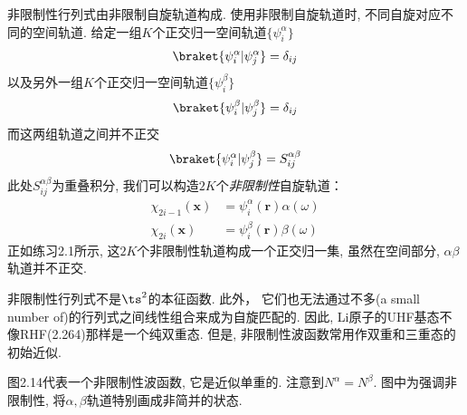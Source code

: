 非限制性行列式由非限制自旋轨道构成. 
使用非限制自旋轨道时, 
不同自旋对应不同的空间轨道. 
给定一组$K$个正交归一空间轨道$\{\psi_i^\alpha\}$
\begin{align}
\braket{\psi_i^\alpha|\psi_j^\alpha}=\delta_{ij}
\end{align}
以及另外一组$K$个正交归一空间轨道$\{\psi_i^\beta\}$
\begin{align}
\braket{\psi_i^\beta|\psi_j^\beta}=\delta_{ij}
\end{align}
而这两组轨道之间并不正交
\begin{align}
\braket{\psi_i^\alpha|\psi_j^\beta}=S_{ij}^{\alpha\beta}
\end{align}
此处$S_{ij}^{\alpha\beta}$为重叠积分, 
我们可以构造$2K$个\emph{非限制性}自旋轨道：
\begin{equation}
\begin{split}
\chi_{2i-1}(\mathbf{x}) &= \psi_i^\alpha(\mathbf{r})\alpha(\omega)\\
\chi_{2i}(\mathbf{x})   &= \psi_i^\beta(\mathbf{r})\beta(\omega) 
\end{split}
\end{equation}
正如练习2.1所示, 
这$2K$个非限制性轨道构成一个正交归一集, 
虽然在空间部分, 
$\alpha$$\beta$轨道并不正交.


非限制性行列式不是$\ts^2$的本征函数. 
此外， 
它们也无法通过不多(a small number of)的行列式之间线性组合来成为自旋匹配的. 
因此, 
Li原子的UHF基态不像RHF(2.264)那样是一个纯双重态. 
但是, 
非限制性波函数常用作双重和三重态的初始近似. 


图2.14代表一个非限制性波函数, 
它是近似单重的. 
注意到$N^\alpha = N^\beta$. 
图中为强调非限制性, 
将$\alpha,\beta$轨道特别画成非简并的状态.

